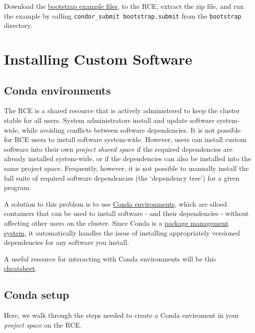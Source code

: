 \documentclass[]{book}
\begin{document}
\begin{enumerate}
  Download the \href{examples_Stata/bootstrap.zip}{bootstrap example
  files}, to the RCE, extract the zip file, and run the example by
  calling \texttt{condor\_submit\ bootstrap.submit} from the
  \texttt{bootstrap} directory.
\end{enumerate}

\chapter{Installing Custom Software}\label{installing-custom-software}

\section{Conda environments}\label{conda-environments}

The RCE is a shared resource that is actively administered to keep the
cluster stable for all users. System administrators install and update
software system-wide, while avoiding conflicts between software
dependencies. It is not possible for RCE users to install software
system-wide. However, users can install custom software into their own
\emph{project shared space} if the required dependencies are already
installed system-wide, or if the dependencies can also be installed into
the same project space. Frequently, however, it is not possible to
manually install the full suite of required software dependencies (the
`dependency tree') for a given program.

A solution to this problem is to use
\href{https://docs.conda.io/projects/conda/en/latest/user-guide/concepts/environments.html}{Conda
environments}, which are siloed containers that can be used to install
software - and their dependencies - without affecting other users on the
cluster. Since Conda is a
\href{https://en.wikipedia.org/wiki/Package_manager}{package management
system}, it automatically handles the issue of installing appropriately
versioned dependencies for any software you install.

A useful resource for interacting with Conda environments will be this
\href{https://docs.conda.io/projects/conda/en/4.6.0/_downloads/52a95608c49671267e40c689e0bc00ca/conda-cheatsheet.pdf}{cheatsheet}.

\section{Conda setup}\label{conda-setup}

Here, we walk through the steps needed to create a Conda enviroment in
your \emph{project space} on the RCE.
\end{document}
